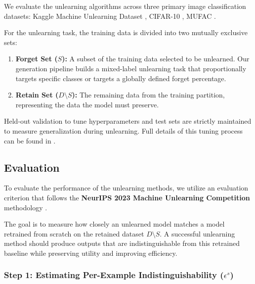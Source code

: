 \documentclass{article}
\begin{document}
We evaluate the unlearning algorithms across three primary image classification datasets: Kaggle Machine Unlearning Dataset \citep{neurips-2023-machine-unlearning}, CIFAR-10 \citep{Krizhevsky09learningmultiple}, MUFAC \citep{choi2023machine}.

For the unlearning task, the training data is divided into two mutually exclusive sets:
\begin{enumerate}
    \item \textbf{Forget Set ($S$):} A subset of the training data selected to be unlearned. Our generation pipeline builds a mixed-label unlearning task that proportionally targets specific classes or targets a globally defined forget percentage.
    \item \textbf{Retain Set ($D \setminus S$):} The remaining data from the training partition, representing the data the model must preserve.
\end{enumerate}

Held-out validation to tune hyperparameters and test sets are strictly maintained to measure generalization during unlearning. Full details of this tuning process can be found in .



\subsection{Evaluation}\label{subsec:evaluation}
To evaluate the performance of the unlearning methods, we utilize an evaluation criterion that follows the \textbf{NeurIPS 2023 Machine Unlearning Competition} methodology \citep{neurips-2023-machine-unlearning}.

The goal is to measure how closely an unlearned model matches a model retrained from scratch on the retained dataset $D \setminus S$. A successful unlearning method should produce outputs that are indistinguishable from this retrained baseline while preserving utility and improving efficiency.



\subsubsection*{Step 1: Estimating Per-Example Indistinguishability ($\epsilon^s$)}
\end{document}

